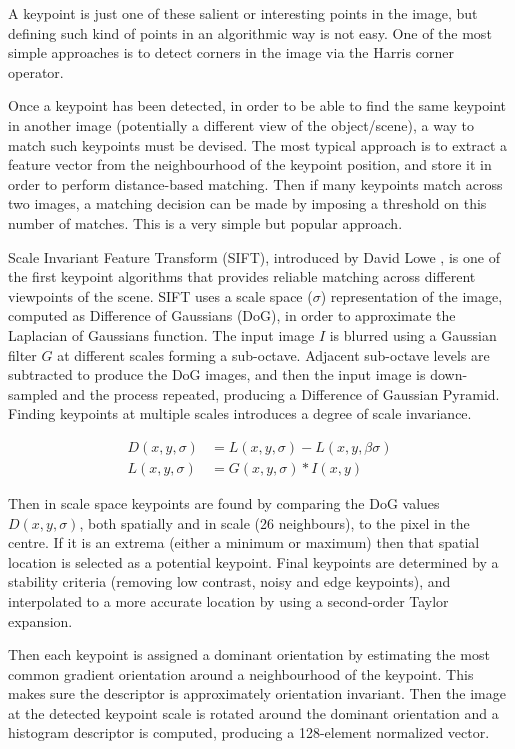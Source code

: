 A keypoint is just one of these salient or interesting points in the image, but defining such kind of points in an algorithmic way is not easy. One of the most simple approaches is to detect corners in the image via the Harris corner operator.

Once a keypoint has been detected, in order to be able to find the same keypoint in another image (potentially a different view of the object/scene), a way to match such keypoints must be devised. The most typical approach is to extract a feature vector from the neighbourhood of the keypoint position, and store it in order to perform distance-based matching. Then if many keypoints match across two images, a matching decision can be made by imposing a threshold on this number of matches. This is a very simple but popular approach.

Scale Invariant Feature Transform (SIFT), introduced by David Lowe \cite{lowe2004distinctive}, is one of the first keypoint algorithms that provides reliable matching across different viewpoints of the scene. SIFT uses a scale space ($\sigma$) representation of the image, computed as Difference of Gaussians (DoG), in order to approximate the Laplacian of Gaussians function. The input image $I$ is blurred using a Gaussian filter $G$ at different scales forming a sub-octave. Adjacent sub-octave levels are subtracted to produce the DoG images, and then the input image is down-sampled and the process repeated, producing a Difference of Gaussian Pyramid. Finding keypoints at multiple scales introduces a degree of scale invariance.

\begin{align}
	D(x, y, \sigma) &= L(x, y, \sigma) - L(x, y, \beta \sigma)\\
	L(x, y, \sigma) &= G(x, y, \sigma) * I(x, y)
\end{align}

Then in scale space keypoints are found by comparing the DoG values $D(x, y, \sigma)$, both spatially and in scale (26 neighbours), to the pixel in the centre. If it is an extrema (either a minimum or maximum) then that spatial location is selected as a potential keypoint. Final keypoints are determined by a stability criteria (removing low contrast, noisy and edge keypoints), and interpolated to a more accurate location by using a second-order Taylor expansion.

Then each keypoint is assigned a dominant orientation by estimating the most common gradient orientation around a neighbourhood of the keypoint. This makes sure the descriptor is approximately orientation invariant. Then the image at the detected keypoint scale is rotated around the dominant orientation and a histogram descriptor is computed, producing a 128-element normalized vector.

